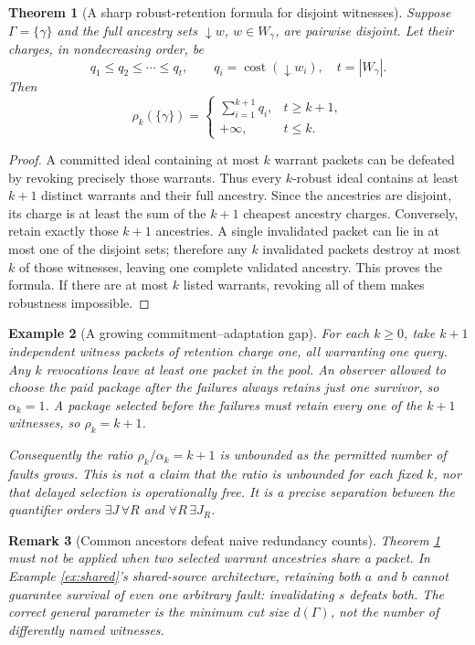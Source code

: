 \documentclass[11pt,letterpaper]{article}
\newtheorem{theorem}{Theorem}[section]
\newtheorem{example}[theorem]{Example}
\newtheorem{remark}[theorem]{Remark}
\DeclareMathOperator{\cost}{cost}
\newcommand{\Gam}{\Gamma}
\begin{document}
\begin{theorem}[A sharp robust-retention formula for disjoint witnesses]\label{thm:robust}
Suppose $\Gam=\{\gamma\}$ and the full ancestry sets $\downarrow w$, $w\in W_\gamma$, are pairwise disjoint. Let their charges, in nondecreasing order, be
\[
q_1\le q_2\le\cdots\le q_t,\qquad
q_i=\cost(\downarrow w_i),\quad t=|W_\gamma|.
\]
Then
\[
\rho_k(\{\gamma\})=
\begin{cases}
\sum_{i=1}^{k+1}q_i,&t\ge k+1,\\
+\infty,&t\le k.
\end{cases}
\tag{12}\label{eq:robust}
\]
\end{theorem}
\begin{proof}
A committed ideal containing at most $k$ warrant packets can be defeated by revoking precisely those warrants. Thus every $k$-robust ideal contains at least $k+1$ distinct warrants and their full ancestry. Since the ancestries are disjoint, its charge is at least the sum of the $k+1$ cheapest ancestry charges. Conversely, retain exactly those $k+1$ ancestries. A single invalidated packet can lie in at most one of the disjoint sets; therefore any $k$ invalidated packets destroy at most $k$ of those witnesses, leaving one complete validated ancestry. This proves the formula. If there are at most $k$ listed warrants, revoking all of them makes robustness impossible.
\end{proof}

\begin{example}[A growing commitment--adaptation gap]\label{ex:gap}
For each $k\ge0$, take $k+1$ independent witness packets of retention charge one, all warranting one query. Any $k$ revocations leave at least one packet in the pool. An observer allowed to choose the paid package after the failures always retains just one survivor, so $\alpha_k=1$. A package selected before the failures must retain every one of the $k+1$ witnesses, so $\rho_k=k+1$.

Consequently the ratio $\rho_k/\alpha_k=k+1$ is unbounded as the permitted number of faults grows. This is \emph{not} a claim that the ratio is unbounded for each fixed $k$, nor that delayed selection is operationally free. It is a precise separation between the quantifier orders $\exists J\,\forall R$ and $\forall R\,\exists J_R$.
\end{example}

\begin{remark}[Common ancestors defeat naive redundancy counts]
Theorem \ref{thm:robust} must not be applied when two selected warrant ancestries share a packet. In Example \ref{ex:shared}'s shared-source architecture, retaining both $a$ and $b$ cannot guarantee survival of even one arbitrary fault: invalidating $s$ defeats both. The correct general parameter is the minimum cut size $d(\Gam)$, not the number of differently named witnesses.
\end{remark}
\end{document}
